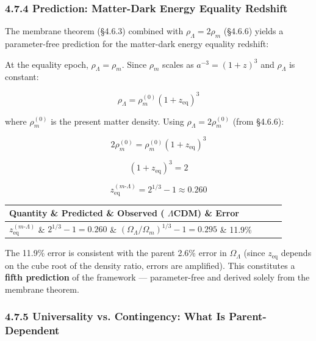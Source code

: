 \documentclass[11pt,a4paper]{article}
\theoremstyle{definition}\newtheorem{definition}{Definition}
\theoremstyle{remark}\newtheorem{remark}{Remark}
\begin{document}
\subsubsection{4.7.4 Prediction: Matter-Dark Energy Equality Redshift}

The membrane theorem (§4.6.3) combined with $\rho_\Lambda = 2\rho_m$ (§4.6.6) yields a parameter-free prediction for the matter-dark energy equality redshift:

At the equality epoch, $\rho_\Lambda = \rho_m$. Since $\rho_m$ scales as $a^{-3} = (1+z)^3$ and $\rho_\Lambda$ is constant:


\begin{equation}
\rho_\Lambda = \rho_m^{(0)} (1 + z_{\text{eq}})^3
\end{equation}


where $\rho_m^{(0)}$ is the present matter density. Using $\rho_\Lambda = 2 \rho_m^{(0)}$ (from §4.6.6):


\begin{equation}
2\rho_m^{(0)} = \rho_m^{(0)} (1 + z_{\text{eq}})^3
\end{equation}



\begin{equation}
(1 + z_{\text{eq}})^3 = 2
\end{equation}



\begin{equation}
\boxed{z_{\text{eq}}^{(m\text{-}\Lambda)} = 2^{1/3} - 1 \approx 0.260}
\end{equation}


\begin{longtable}{llll}
\hline
Quantity \& Predicted \& Observed ( $\Lambda$CDM) \& Error \\
\hline
$z_{\text{eq}}^{(m\text{-}\Lambda)}$ \& $2^{1/3} - 1 = 0.260$ \& $(\Omega_\Lambda/\Omega_m)^{1/3} - 1 = 0.295$ \& 11.9\% \\
\hline
\end{longtable}
The 11.9\% error is consistent with the parent 2.6\% error in $\Omega_\Lambda$ (since $z_{\text{eq}}$ depends on the cube root of the density ratio, errors are amplified). This constitutes a \textbf{fifth prediction} of the framework — parameter-free and derived solely from the membrane theorem.
\subsubsection{4.7.5 Universality vs. Contingency: What Is Parent-Dependent}
\end{document}
